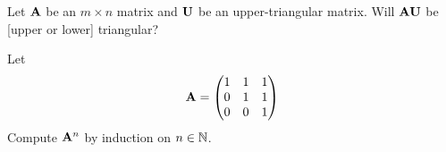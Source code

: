 \begin{exercise}
Let $\mathbf{A}$ be an $m\times n$ matrix and $\mathbf{U}$ be an
upper-triangular matrix. Will $\mathbf{A}\mathbf{U}$ be [upper or lower] triangular?
\end{exercise}

\begin{exercise}
  Let
  \[\mathbf{A} = \begin{pmatrix}
    1 & 1 & 1\\
    0 & 1 & 1\\
    0 & 0 & 1
  \end{pmatrix} \]
  Compute $\mathbf{A}^{n}$ by induction on $n\in\mathbb{N}$.
\end{exercise}